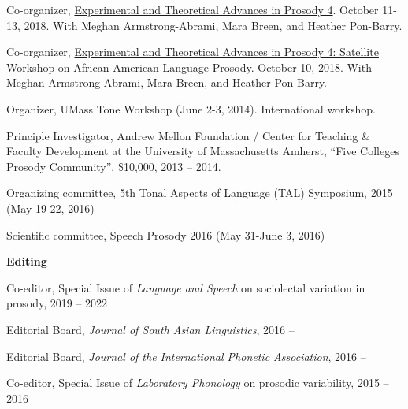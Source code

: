 \documentclass[10pt]{article}
\newcommand{\blankline}{\quad\pagebreak[3]}
\newcommand{\halfblankline}{\quad\vspace{-0.5\baselineskip}\pagebreak[3]}
\begin{document}
    \begin{innerlist}

    \item Co-organizer, \href{https://etap4.krisyu.org}{Experimental and Theoretical Advances in
        Prosody 4}. October 11-13, 2018. With Meghan Armstrong-Abrami, Mara Breen, and Heather Pon-Barry.
      
    \item Co-organizer, \href{https://etap4.krisyu.org/aae}{Experimental and Theoretical Advances in
        Prosody 4: Satellite Workshop on African American Language Prosody}. October 10, 2018. With Meghan Armstrong-Abrami, Mara Breen, and Heather Pon-Barry.
      
        \item Organizer, UMass Tone Workshop (June 2-3,
          2014). International workshop.
        \begin{innerlist}[\enskip$\circ$,leftmargin=*]
            \item Principle Investigator, Andrew Mellon Foundation / Center for Teaching \& Faculty
      Development at the University of Massachusetts Amherst, ``Five
      Colleges Prosody Community'', \$10,000, 2013 -- 2014.
        \end{innerlist}

        \halfblankline

        \item Organizing committee, 5th Tonal Aspects of Language (TAL)
          Symposium, 2015 (May 19-22, 2016)

        \item Scientific committee, Speech Prosody 2016 (May 31-June
          3, 2016)

        \end{innerlist}

\blankline

\textbf{Editing}

\begin{innerlist}

\item Co-editor, Special Issue of \textit{Language and Speech} on sociolectal variation in prosody, 2019 -- 2022
\item Editorial Board, \textit{Journal of South Asian Linguistics},
  2016 --
\item Editorial Board, \textit{Journal of the International Phonetic
    Association}, 2016 --  
\item Co-editor, Special Issue of \textit{Laboratory
    Phonology} on prosodic variability, 2015 -- 2016
\end{innerlist}
\end{document}
